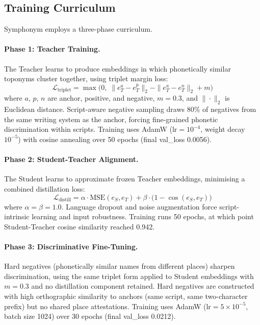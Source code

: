 \documentclass[11pt,a4paper]{article}
\begin{document}
\subsection{Training Curriculum}
\label{subsec:training}

Symphonym employs a three-phase curriculum.

\paragraph{Phase 1: Teacher Training.} The Teacher learns to produce embeddings in which phonetically similar toponyms cluster together, using triplet margin loss:
\begin{equation}
\mathcal{L}_{\text{triplet}} = \max\!\big(0,\; \|e_T^a - e_T^p\|_2 - \|e_T^a - e_T^n\|_2 + m\big)
\label{eq:phase1-loss}
\end{equation}
where $a$, $p$, $n$ are anchor, positive, and negative, $m = 0.3$, and $\|\cdot\|_2$ is Euclidean distance. Script-aware negative sampling draws 80\% of negatives from the same writing system as the anchor, forcing fine-grained phonetic discrimination within scripts. Training uses AdamW ($\text{lr} = 10^{-4}$, weight decay $10^{-5}$) with cosine annealing over 50 epochs (final val\_loss 0.0056).

\paragraph{Phase 2: Student-Teacher Alignment.} The Student learns to approximate frozen Teacher embeddings, minimising a combined distillation loss:
\begin{equation}
\mathcal{L}_{\text{distill}} = \alpha \cdot \text{MSE}(e_S, e_T) + \beta \cdot \big(1 - \cos(e_S, e_T)\big)
\label{eq:phase2-loss}
\end{equation}
where $\alpha = \beta = 1.0$. Language dropout and noise augmentation force script-intrinsic learning and input robustness. Training runs 50 epochs, at which point Student-Teacher cosine similarity reached 0.942.

\paragraph{Phase 3: Discriminative Fine-Tuning.} Hard negatives (phonetically similar names from different places) sharpen discrimination, using the same triplet form applied to Student embeddings with $m = 0.3$ and no distillation component retained. Hard negatives are constructed with high orthographic similarity to anchors (same script, same two-character prefix) but no shared place attestations. Training uses AdamW ($\text{lr} = 5 \times 10^{-5}$, batch size 1024) over 30 epochs (final val\_loss 0.0212).
\end{document}
